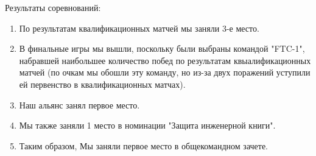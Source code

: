 Результаты соревнований:
\begin{enumerate}
	\item По результатам квалификационных матчей мы заняли 3-е место.
	
	\item В финальные игры мы вышли, поскольку были выбраны командой "FTC-1", набравшей наибольшее количество побед по результатам квыалификационных матчей (по очкам мы обошли эту команду, но из-за двух поражений уступили ей первенство в квалификационных матчах).
	
	\item Наш альянс занял первое место.
	
	\item Мы также заняли 1 место в номинации "Защита инженерной книги".
	
	\item Таким образом, Мы заняли первое место в общекомандном зачете.
\end{enumerate}

